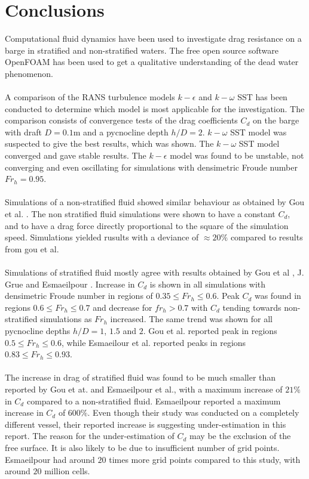 \documentclass[a4paper, 12pt]{report}
\begin{document}
\section{Conclusions}
Computational fluid dynamics have been used to investigate drag resistance on a barge in stratified and non-stratified waters. The free open source software OpenFOAM has been used to get a qualitative understanding of the dead water phenomenon.\\
\\
A comparison of the RANS turbulence models $k-\epsilon$ and $k-\omega$ SST has been conducted to determine which model is most applicable for the investigation. The comparison consists of convergence tests of the drag coefficients $C_d$ on the barge with draft $D=0.1$m and a pycnocline depth $h/D=2$. $k-\omega$ SST model was suspected to give the best results, which was shown. The $k-\omega$ SST model converged and gave stable results. The $k-\epsilon$ model was found to be unstable, not converging and even oscillating for simulations with densimetric Froude number $Fr_h= 0.95$.\\
\\
Simulations of a non-stratified fluid showed similar behaviour as obtained by Gou et al. \cite{Gou}. The non stratified fluid simulations were shown to have a constant $C_d$, and to have a drag force directly proportional to the square of the simulation speed. Simulations yielded rusults with a deviance of $\approx 20\%$ compared to results from gou et al.\\
\\
Simulations of stratified fluid mostly agree with results obtained by Gou et al \cite{Gou}, J. Grue \cite{Grue} and Esmaeilpour \cite{Esmaeilpour}.  Increase in $C_d$ is shown in all simulations with densimetric Froude number in regions of $0.35 \leq Fr_h \leq 0.6$. Peak $C_d$ was found in regions $0.6 \leq Fr_h \leq 0.7$ and decrease for $fr_h > 0.7$ with $C_d$ tending towards non-stratified simulations as $Fr_h$ increased. The same trend was shown for all pycnocline depths $h/D=1$, $1.5$ and $2$. Gou et al. reported peak in regions $0.5 \leq Fr_h \leq 0.6$, while Esmaeilour et al. reported peaks in regions $0.83\leq Fr_h \leq 0.93$.\\
\\
The increase in drag of stratified fluid was found to be much smaller than reported by Gou et at. and Esmaeilpour et al., with a maximum increase of $21\%$ in $C_d$ compared to a non-stratified fluid. Esmaeilpour reported a maximum increase in $C_d$ of $600\%$. Even though their study was conducted on a completely different vessel, their reported increase is suggesting under-estimation in this report. The reason for the under-estimation of $C_d$ may be the exclusion of the free surface. It is also likely to be due to insufficient number of grid points. Esmaeilpour had around $20$ times more grid points compared to this study, with around $20$ million cells.\\
\end{document}
